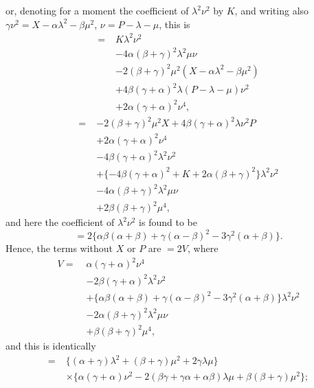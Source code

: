 \documentclass[11pt,a4paper]{article}
\begin{document}
\newpage


or, denoting for a moment the coefficient of $\lambda^{2}\nu^{2}$ by $K$, and writing also $\gamma\nu^{2} = X - \alpha\lambda^{2} - \beta\mu^{2}$, $\nu = P - \lambda - \mu$, this is
\[
\begin{aligned}
=\;& K\lambda^{2}\nu^{2} \\
& - 4\alpha(\beta + \gamma)^{2}\lambda^{2}\mu\nu \\
& - 2(\beta + \gamma)^{2}\mu^{2}(X - \alpha\lambda^{2} - \beta\mu^{2}) \\
& + 4\beta(\gamma + \alpha)^{2}\lambda(P - \lambda - \mu)\nu^{2} \\
& + 2\alpha(\gamma + \alpha)^{2}\nu^{4},
\end{aligned}
\]
\[
\begin{aligned}
=\;& -2(\beta + \gamma)^{2}\mu^{2} X + 4\beta(\gamma + \alpha)^{2}\lambda\nu^{2} P \\
& + 2\alpha(\gamma + \alpha)^{2}\nu^{4} \\
& - 4\beta(\gamma + \alpha)^{2}\lambda^{2}\nu^{2} \\
& + \{-4\beta(\gamma + \alpha)^{2} + K + 2\alpha(\beta + \gamma)^{2}\}\lambda^{2}\nu^{2} \\
& - 4\alpha(\beta + \gamma)^{2}\lambda^{2}\mu\nu \\
& + 2\beta(\beta + \gamma)^{2}\mu^{4},
\end{aligned}
\]
and here the coefficient of $\lambda^{2}\nu^{2}$ is found to be
\[
= 2\{\alpha\beta(\alpha + \beta) + \gamma(\alpha - \beta)^{2} - 3\gamma^{2}(\alpha + \beta)\}.
\]
Hence, the terms without $X$ or $P$ are $= 2V$, where
\[
\begin{aligned}
V =\;& \alpha(\gamma + \alpha)^{2}\nu^{4} \\
& - 2\beta(\gamma + \alpha)^{2}\lambda^{2}\nu^{2} \\
& + \{\alpha\beta(\alpha + \beta) + \gamma(\alpha - \beta)^{2} - 3\gamma^{2}(\alpha + \beta)\}\lambda^{2}\nu^{2} \\
& - 2\alpha(\beta + \gamma)^{2}\lambda^{2}\mu\nu \\
& + \beta(\beta + \gamma)^{2}\mu^{4},
\end{aligned}
\]
and this is identically
\[
\begin{aligned}
=\;& \{(\alpha + \gamma)\lambda^{2} + (\beta + \gamma)\mu^{2} + 2\gamma\lambda\mu\} \\
& \times \{\alpha(\gamma + \alpha)\nu^{2} - 2(\beta\gamma + \gamma\alpha + \alpha\beta)\lambda\mu + \beta(\beta + \gamma)\mu^{2}\};
\end{aligned}
\]
\end{document}
